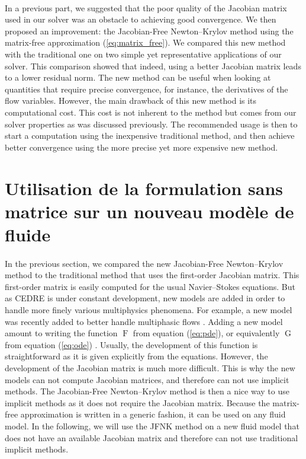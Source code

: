    \paragraph{}
    In a previous part, we suggested that the poor quality of the Jacobian matrix used in our solver was an obstacle to achieving good convergence.
    We then proposed an improvement: the Jacobian-Free Newton--Krylov method using the matrix-free approximation (\ref{eq:matrix_free}).
    We compared this new method with the traditional one on two simple yet representative applications of our solver.
    This comparison showed that indeed, using a better Jacobian matrix leads to a lower residual norm.
    The new method can be useful when looking at quantities that require precise convergence, for instance, the derivatives of the flow variables.
    However, the main drawback of this new method is its computational cost.
    This cost is not inherent to the method but comes from our solver properties as was discussed previously.
    The recommended usage is then to start a computation using the inexpensive traditional method, and then achieve better convergence using the more precise yet more expensive new method.


  \section{Utilisation de la formulation sans matrice sur un nouveau modèle de fluide}

    \paragraph{}
    In the previous section, we compared the new Jacobian-Free Newton--Krylov method to the traditional method that uses the first-order Jacobian matrix.
    This first-order matrix is easily computed for the usual Navier--Stokes equations.
    But as CEDRE is under constant development, new models are added in order to handle more finely various multiphysics phenomena.
    For example, a new model was recently added to better handle multiphasic flows .
    Adding a new model amount to writing the function $\operatorname{F}$ from equation (\ref{eq:pde}), or equivalently $\operatorname{G}$ from equation (\ref{eq:ode}) .
    Usually, the development of this function is straightforward as it is given explicitly from the equations.
    However, the development of the Jacobian matrix is much more difficult.
    This is why the new models can not compute Jacobian matrices, and therefore can not use implicit methods.
    The Jacobian-Free Newton--Krylov method is then a nice way to use implicit methods as it does not require the Jacobian matrix.
    Because the matrix-free approximation is written in a generic fashion, it can be used on any fluid model.
    In the following, we will use the JFNK method on a new fluid model that does not have an available Jacobian matrix and therefore can not use traditional implicit methods.


